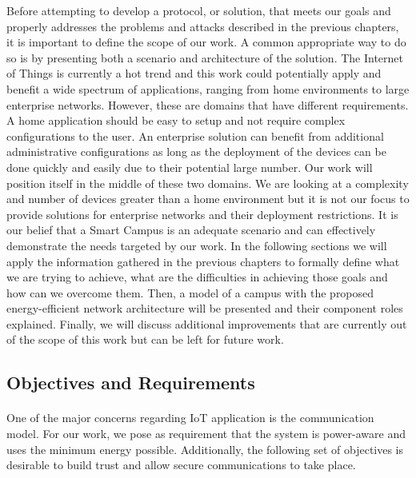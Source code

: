 Before attempting to develop a protocol, or solution, that meets our goals and properly addresses the problems and attacks described in the previous chapters, it is important to define the scope of our work. A common appropriate way to do so is by presenting both a scenario and architecture of the solution. The Internet of Things is currently a hot trend and this work could potentially apply and benefit a wide spectrum of applications, ranging from home environments to large enterprise networks. However, these are domains that have different requirements. A home application should be easy to setup and not require complex configurations to the user. An enterprise solution can benefit from additional administrative configurations as long as the deployment of the devices can be done quickly and easily due to their potential large number. Our work will position itself in the middle of these two domains. We are looking at a complexity and number of devices greater than a home environment but it is not our focus to provide solutions for enterprise networks and their deployment restrictions. It is our belief that a Smart Campus is an adequate scenario and can effectively demonstrate the needs targeted by our work. In the following sections we will apply the information gathered in the previous chapters to formally define what we are trying to achieve, what are the difficulties in achieving those goals and how can we overcome them. Then, a model of a campus with the proposed energy-efficient network architecture will be presented and their component roles explained. Finally, we will discuss additional improvements that are currently out of the scope of this work but can be left for future work.

\subsection{Objectives and Requirements}
\paragraph{}
One of the major concerns regarding \ac{IoT} application is the communication model. For our work, we pose as requirement that the system is power-aware and uses the minimum energy possible. Additionally, the following set of objectives is desirable to build trust and allow secure communications to take place.

